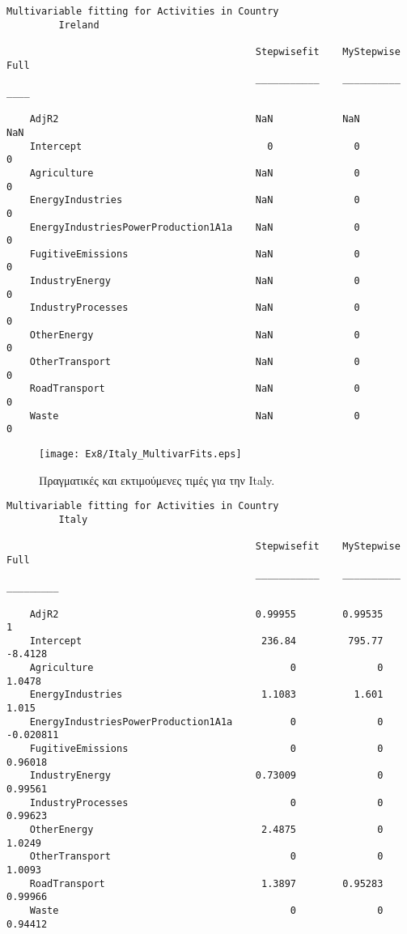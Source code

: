 \documentclass[11pt]{scrartcl} %
\begin{document}
\begin{Verbatim}[fontsize=\small]
Multivariable fitting for Activities in Country
 	 	 Ireland

                                           Stepwisefit    MyStepwise    Full
                                           ___________    __________    ____

    AdjR2                                  NaN            NaN           NaN 
    Intercept                                0              0             0 
    Agriculture                            NaN              0             0 
    EnergyIndustries                       NaN              0             0 
    EnergyIndustriesPowerProduction1A1a    NaN              0             0 
    FugitiveEmissions                      NaN              0             0 
    IndustryEnergy                         NaN              0             0 
    IndustryProcesses                      NaN              0             0 
    OtherEnergy                            NaN              0             0 
    OtherTransport                         NaN              0             0 
    RoadTransport                          NaN              0             0 
    Waste                                  NaN              0             0
\end{Verbatim}



\begin{figure}[H]

	\centering
	\texttt{[image: Ex8/Italy\_MultivarFits.eps]}	
\caption{Πραγματικές και εκτιμούμενες τιμές για την Italy.}
\label{fig:z89} 
\end{figure}



\begin{Verbatim}[fontsize=\small]
Multivariable fitting for Activities in Country
 	 	 Italy

                                           Stepwisefit    MyStepwise      Full   
                                           ___________    __________    _________

    AdjR2                                  0.99955        0.99535               1
    Intercept                               236.84         795.77         -8.4128
    Agriculture                                  0              0          1.0478
    EnergyIndustries                        1.1083          1.601           1.015
    EnergyIndustriesPowerProduction1A1a          0              0       -0.020811
    FugitiveEmissions                            0              0         0.96018
    IndustryEnergy                         0.73009              0         0.99561
    IndustryProcesses                            0              0         0.99623
    OtherEnergy                             2.4875              0          1.0249
    OtherTransport                               0              0          1.0093
    RoadTransport                           1.3897        0.95283         0.99966
    Waste                                        0              0         0.94412
\end{Verbatim}
\end{document}

